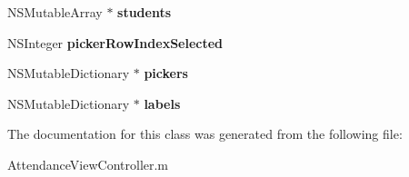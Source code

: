 \begin{DoxyCompactItemize}
\item 
\hypertarget{interface_attendance_view_controller_07_08_a4a32f7bf5091ca35e5544555e6b396f9}{\-N\-S\-Mutable\-Array $\ast$ {\bfseries students}}\label{interface_attendance_view_controller_07_08_a4a32f7bf5091ca35e5544555e6b396f9}

\item 
\hypertarget{interface_attendance_view_controller_07_08_ace370817544add80608e93a340fdd68b}{\-N\-S\-Integer {\bfseries picker\-Row\-Index\-Selected}}\label{interface_attendance_view_controller_07_08_ace370817544add80608e93a340fdd68b}

\item 
\hypertarget{interface_attendance_view_controller_07_08_a9d09c64ff329a6aecfcb4474e8ae5a13}{\-N\-S\-Mutable\-Dictionary $\ast$ {\bfseries pickers}}\label{interface_attendance_view_controller_07_08_a9d09c64ff329a6aecfcb4474e8ae5a13}

\item 
\hypertarget{interface_attendance_view_controller_07_08_a9802e5f67531628f9748c80dca67dc40}{\-N\-S\-Mutable\-Dictionary $\ast$ {\bfseries labels}}\label{interface_attendance_view_controller_07_08_a9802e5f67531628f9748c80dca67dc40}

\end{DoxyCompactItemize}


\-The documentation for this class was generated from the following file\-:\begin{DoxyCompactItemize}
\item 
\-Attendance\-View\-Controller.\-m\end{DoxyCompactItemize}
